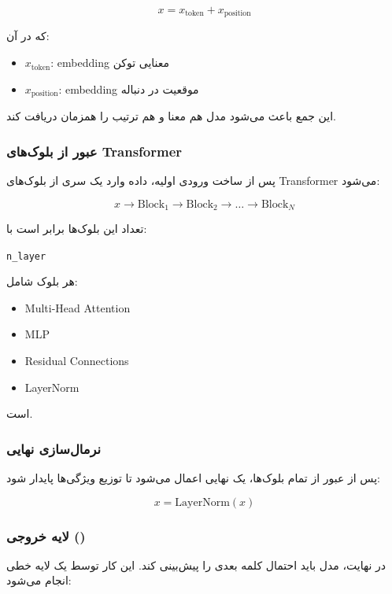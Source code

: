 \documentclass{article}
\begin{document}
\[
x = x_{\text{token}} + x_{\text{position}}
\]

که در آن:

\begin{itemize}
	\item \( x_{\text{token}} \): embedding معنایی توکن
	\item \( x_{\text{position}} \): embedding موقعیت در دنباله
\end{itemize}

این جمع باعث می‌شود مدل هم معنا و هم ترتیب را همزمان دریافت کند.

\subsubsection*{عبور از بلوک‌های Transformer}

پس از ساخت ورودی اولیه، داده وارد یک سری از بلوک‌های Transformer می‌شود:

\[
x \rightarrow \text{Block}_1 \rightarrow \text{Block}_2 \rightarrow \dots \rightarrow \text{Block}_N
\]

تعداد این بلوک‌ها برابر است با:

\begin{latin}
	\texttt{n\_layer}
\end{latin}

هر بلوک شامل:

\begin{itemize}
	\item Multi-Head Attention
	\item MLP
	\item Residual Connections
	\item LayerNorm
\end{itemize}

است.

\subsubsection*{نرمال‌سازی نهایی}

پس از عبور از تمام بلوک‌ها، یک  نهایی اعمال می‌شود تا توزیع ویژگی‌ها پایدار شود:

\[
x = \text{LayerNorm}(x)
\]

\subsubsection*{لایه خروجی ()}

در نهایت، مدل باید احتمال کلمه بعدی را پیش‌بینی کند. این کار توسط یک لایه خطی انجام می‌شود:
\end{document}
